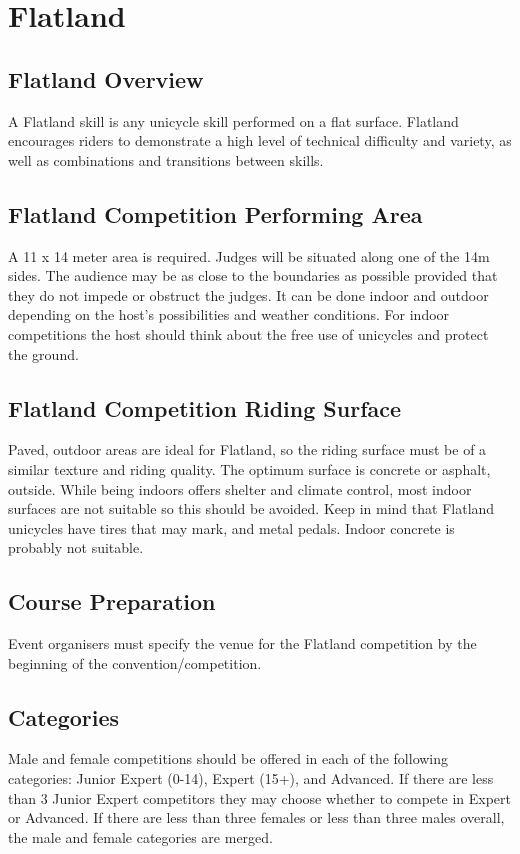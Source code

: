 \chapter{Flatland}

\section{Flatland Overview \label{sec:flat-street_flatland-overview}}
A Flatland skill is any unicycle skill performed on a flat surface.
Flatland encourages riders to demonstrate a high level of technical difficulty and variety, as well as combinations and transitions between skills.

\section{Flatland Competition Performing Area \label{sec:flat-street_flatland-performing-area}}
A 11 x 14 meter area is required.
Judges will be situated along one of the 14m sides.
The audience may be as close to the boundaries as possible provided that they do not impede or obstruct the judges.
It can be done indoor and outdoor depending on the host's possibilities and weather conditions.
For indoor competitions the host should think about the free use of unicycles and protect the ground.

\section{Flatland Competition Riding Surface}
Paved, outdoor areas are ideal for Flatland, so the riding surface must be of a similar texture and riding quality.
The optimum surface is concrete or asphalt, outside.
While being indoors offers shelter and climate control, most indoor surfaces are not suitable so this should be avoided.
Keep in mind that Flatland unicycles have tires that may mark, and metal pedals. Indoor concrete is probably not suitable.

\section{Course Preparation}
Event organisers must specify the venue for the Flatland competition by the beginning of the convention/competition.

\section{Categories}
Male and female competitions should be offered in each of the following categories: Junior Expert (0-14), Expert (15+), and Advanced.
If there are less than 3 Junior Expert competitors they may choose whether to compete in Expert or Advanced.
If there are less than three females or less than three males overall, the male and female categories are merged.

